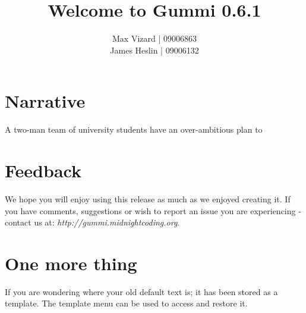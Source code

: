 \documentclass[11pt]{article}
\title{\textbf{Welcome to Gummi 0.6.1}}
\author{Max Vizard | 09006863\\
		James Heslin | 09006132\\}
\begin{document}
\maketitle

\section{Narrative}

A two-man team of university students have an over-ambitious plan to 
\section{Feedback}
We hope you will enjoy using this release as much as we enjoyed creating it. If you have comments, suggestions or wish to report an issue you are experiencing - contact us at: \emph{http://gummi.midnightcoding.org}.

\section{One more thing}
If you are wondering where your old default text is; it has been stored as a template. The template menu can be used to access and restore it. 
\end{document}
